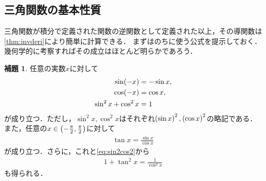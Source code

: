 \documentclass[11pt,a4paper]{ltjsarticle}
\newcommand*{\intd}{\dl2}
\theoremstyle{definition}
\newtheorem{lemma}[dfn]{補題}
\begin{document}
\subsection{三角関数の基本性質} \label{subsec:identity}

三角関数が積分で定義された関数の逆関数として定義された以上，その導関数は\cref{thm:invderi}により簡単に計算できる．
まずはのちに使う公式を提示しておく．幾何学的に考察すればその成立はほとんど明らかであろう．

\begin{lemma} \label{lemma:sin2cos2}
  任意の実数$x$に対して
  \begin{align}
    \apply{\sin}{-x}    & = - \sin x,
    \label{eq:sinodd}                 \\
    \apply{\cos}{-x}    & = \cos x,
    \label{eq:coseven}                \\
    \sin^2 x + \cos^2 x & = 1
    \label{eq:sin2cos2}
  \end{align}
  が成り立つ．ただし，$\sin^2 x, \cos^2 x$はそれぞれ$\paren{\sin x}^2 ,\paren{\cos x}^2$の略記である．
  また，任意の$x \in \interval{op}{- \frac{\pi}{2}, \frac{\pi}{2}}$に対して
  \begin{align}
    \tan x = \frac{\sin x}{\cos x}
    \label{eq:tanfrac}
  \end{align}
  が成り立つ．さらに，これと\cref{eq:sin2cos2}から
  \begin{align}
    1 + \tan ^2 x = \frac{1}{\cos^2 x}
    \label{eq:tancos}
  \end{align}
  も得られる．
\end{lemma}

%
\end{document}
